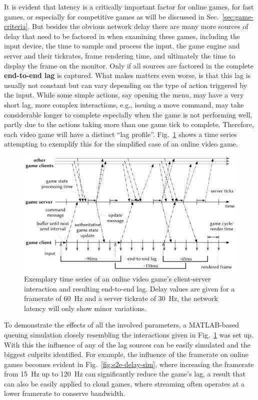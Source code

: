 It is evident that latency is a critically important factor for online games, for fast games, or especially for competitive games as will be discussed in Sec.~\ref{sec:game-criteria}. But besides the obvious network delay there are many more sources of delay that need to be factored in when examining these games, including the input device, the time to sample and process the input, the game engine and server and their tickrates, frame rendering time, and ultimately the time to display the frame on the monitor. Only if all sources are factored in the complete \textbf{end-to-end lag} is captured. What makes matters even worse, is that this lag is usually not constant but can vary depending on the type of action triggered by the input. While some simple actions, say opening the menu, may have a very short lag, more complex interactions, e.g., issuing a move command, may take considerable longer to complete especially when the game is not performing well, partly due to the actions taking more than one game tick to complete. Therefore, each video game will have a distinct ``lag profile''.  Fig.~\ref{fig:tickrate-timeseries} shows a time series attempting to exemplify this for the simplified case of an online video game.


\begin{figure}[!t]
	\centering
	\includegraphics[width=1.0\columnwidth]{../models/tickrate-timeseries.pdf}
	\caption{Exemplary time series of an online video game's client-server interaction and resulting end-to-end lag. Delay values are given for a framerate of \SI{60}{\hertz} and a server tickrate of \SI{30}{\hertz}, the network latency will only show minor variations.}
\label{fig:tickrate-timeseries}
\end{figure}

To demonstrate the effects of all the involved parameters, a MATLAB-based queuing simulation closely resembling the interactions given in Fig.~\ref{fig:tickrate-timeseries} was set up. With this the influence of any of the lag sources can be easily simulated and the biggest culprits identified. For example, the influence of the framerate on online games becomes evident in Fig.~\ref{fig:e2e-delay-sim}, where increasing the framerate from \SI{15}{\hertz} up to \SI{120}{\hertz} can significantly reduce the game's lag, a result that can also be easily applied to cloud games, where streaming often operates at a lower framerate to conserve bandwidth.

